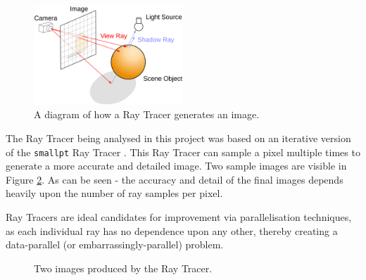 \documentclass[journal,transmag]{IEEEtran}
\begin{document}
		\begin{figure}[h]
			\centering
			\includegraphics[width = 0.5\textwidth]{raytracerDiagram}
			\caption{A diagram of how a Ray Tracer generates an image.}
			\label{fig_ray_tracer_diagram}
		\end{figure}
	
		The Ray Tracer being analysed in this project was based on an iterative version of the \texttt{smallpt} Ray Tracer \cite{smallptG75:online}. This Ray Tracer can sample a pixel multiple times to generate a more accurate and detailed image. Two sample images are visible in Figure \ref{fig_ray_traced_images}. As can be seen - the accuracy and detail of the final images depends heavily upon the number of ray samples per pixel.
		
		Ray Tracers are ideal candidates for improvement via parallelisation techniques, as each individual ray has no dependence upon any other, thereby creating a data-parallel (or embarrassingly-parallel) problem.
		
		\begin{figure}[]
			\centering
			\hfil
			\caption{Two images produced by the Ray Tracer.}
			\label{fig_ray_traced_images}
		\end{figure}
		
\end{document}
